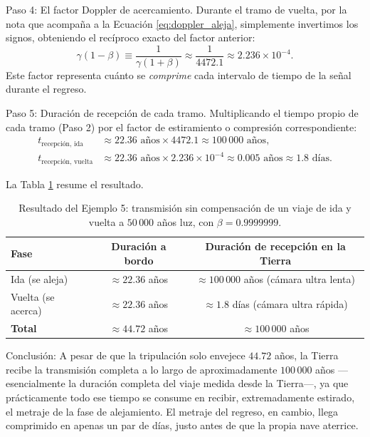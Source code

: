 \documentclass[11pt,a4paper]{book}
\begin{document}
Paso 4: El factor Doppler de acercamiento. Durante el tramo de vuelta, por la nota que
acompaña a la Ecuación \eqref{eq:doppler_aleja}, simplemente invertimos los signos, obteniendo el recíproco
exacto del factor anterior:
\begin{equation}
    \gamma(1-\beta) \equiv \frac{1}{\gamma(1+\beta)} \approx \frac{1}{4472.1} \approx
    2.236\times10^{-4}.
\end{equation}
Este factor representa cuánto se \textit{comprime} cada intervalo de tiempo de la señal
durante el regreso.

Paso 5: Duración de recepción de cada tramo. Multiplicando el tiempo propio de cada
tramo (Paso 2) por el factor de estiramiento o compresión correspondiente:
\begin{align}
    t_{\text{recepción, ida}} &\approx 22.36 \text{ años} \times 4472.1 \approx 100\,000
    \text{ años},\\
    t_{\text{recepción, vuelta}} &\approx 22.36 \text{ años} \times 2.236\times10^{-4}
    \approx 0.005 \text{ años} \approx 1.8 \text{ días}.
\end{align}

    La Tabla \ref{tab:doppler-nave} resume el resultado.

\begin{table}[h]
\centering
\begin{tabular}{lcc}
\hline
\textbf{Fase} & \textbf{Duración a bordo} & \textbf{Duración de recepción en la Tierra} \\
\hline
Ida (se aleja)   & $\approx 22.36$ años & $\approx 100\,000$ años (cámara ultra lenta) \\
Vuelta (se acerca) & $\approx 22.36$ años & $\approx 1.8$ días (cámara ultra rápida) \\
\hline
\textbf{Total} & $\approx 44.72$ años & $\approx 100\,000$ años \\
\hline
\end{tabular}
\caption{Resultado del Ejemplo 5: transmisión sin compensación de un viaje de ida y vuelta
a $50\,000$ años luz, con $\beta = 0.9999999$.}
\label{tab:doppler-nave}
\end{table}

    Conclusión: A pesar de que la tripulación solo envejece $44.72$ años, la Tierra recibe la
transmisión completa a lo largo de aproximadamente $100\,000$ años —esencialmente la duración
completa del viaje medida desde la Tierra—, ya que prácticamente todo ese tiempo se consume en
recibir, extremadamente estirado, el metraje de la fase de alejamiento. El metraje del regreso,
en cambio, llega comprimido en apenas un par de días, justo antes de que la propia nave aterrice.
\end{document}
